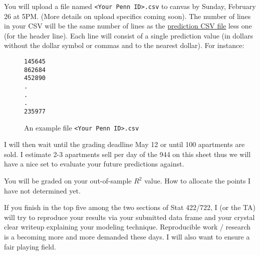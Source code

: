 \documentclass[12pt]{article}
\begin{document}
You will upload a file named \texttt{<Your Penn ID>.csv} to canvas by Sunday, February 26 at 5PM. (More details on upload specifics coming soon). The number of lines in your CSV will be the same number of lines as the \href{https://raw.githubusercontent.com/kapelner/Wharton_Stat_422_722/master/assignments/project/stat_422_722_project_prediction_set.csv}{prediction CSV file} less one (for the header line). Each line will consist of a single prediction value (in dollars without the dollar symbol or commas and to the nearest dollar). For instance:

\begin{figure}[htp]
\begin{Verbatim}[frame=single, fontsize = \small]
145645
862684
452890
.
.
.
235977
\end{Verbatim}
\caption{An example file \texttt{<Your Penn ID>.csv}}
\end{figure}

I will then wait until the grading deadline May 12 or until 100 apartments are sold. I estimate 2-3 apartments sell per day of the 944 on this sheet thus we will have a nice set to evaluate your future predictions against.

You will be graded on your out-of-sample $R^2$ value. How to allocate the points I have not determined yet.

If you finish in the top five among the two sections of Stat 422/722, I (or the TA) will try to reproduce your results via your submitted data frame and your crystal clear writeup explaining your modeling technique. Reproducible work / research is a becoming more and more demanded these days. I will also want to ensure a fair playing field.
\end{document}
